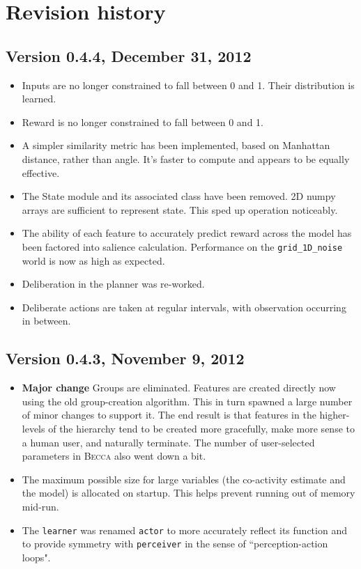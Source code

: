 \chapter{Revision history}

\section*{Version 0.4.4, December 31, 2012}

\begin{itemize}
\item Inputs are no longer constrained to fall between 0 and 1. Their distribution is learned.
\item Reward is no longer constrained to fall between 0 and 1.
\item A simpler similarity metric has been implemented, based on Manhattan distance, rather than angle. It's faster to compute and appears to be equally effective.
\item The State module and its associated class have been removed. 2D numpy arrays are sufficient to represent state. This sped up operation noticeably.
\item The ability of each feature to accurately predict reward across the model has been factored into salience calculation. Performance on the \texttt{grid\_1D\_noise} world is now as high as expected.
\item Deliberation in the planner was re-worked.
\item Deliberate actions are taken at regular intervals, with observation occurring in between. 
\end{itemize}

\section*{Version 0.4.3, November 9, 2012}

\begin{itemize}
\item {\bf Major change} Groups are eliminated. Features are created directly now using the old group-creation algorithm. This in turn spawned a large number of minor changes to support it. The end result is that features in the higher-levels of the hierarchy tend to be created more gracefully, make more sense to a human user, and naturally terminate. The number of user-selected parameters in \textsc{Becca} also went down a bit.
\item The maximum possible size for large variables (the co-activity estimate and the model) is allocated on startup. This helps prevent running out of memory mid-run.
\item The \texttt{learner} was renamed \texttt{actor} to more accurately reflect its function and to provide symmetry with \texttt{perceiver} in the sense of ``perception-action loops". 
\end{itemize}

